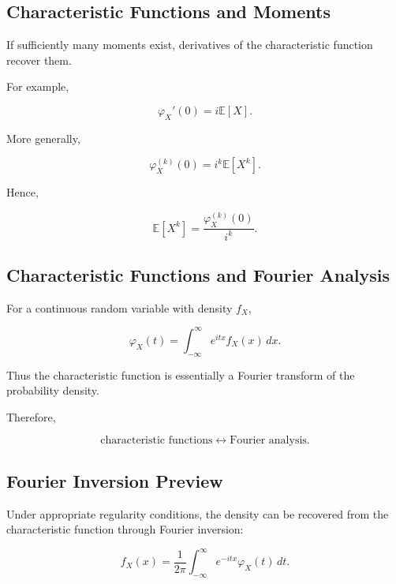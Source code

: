 \subsection{Characteristic Functions and Moments}
\label{subsec:cf-moments}

If sufficiently many moments exist, derivatives of the characteristic
function recover them.

For example,

\[
\varphi_X'(0)
=
i\mathbb{E}[X].
\]

More generally,

\[
\boxed{
\varphi_X^{(k)}(0)
=
i^k
\mathbb{E}[X^k].
}
\]

Hence,

\[
\boxed{
\mathbb{E}[X^k]
=
\frac{
\varphi_X^{(k)}(0)
}{
i^k
}.
}
\]

\subsection{Characteristic Functions and Fourier Analysis}
\label{subsec:cf-fourier-analysis}

For a continuous random variable with density \(f_X\),

\[
\varphi_X(t)
=
\int_{-\infty}^{\infty}
e^{itx}
f_X(x)\,dx.
\]

Thus the characteristic function is essentially a Fourier transform of
the probability density.

Therefore,

\[
\boxed{
\text{characteristic functions}
\longleftrightarrow
\text{Fourier analysis}.
}
\]

\subsection{Fourier Inversion Preview}
\label{subsec:fourier-inversion-probability}

Under appropriate regularity conditions, the density can be recovered
from the characteristic function through Fourier inversion:

\[
\boxed{
f_X(x)
=
\frac1{2\pi}
\int_{-\infty}^{\infty}
e^{-itx}
\varphi_X(t)\,dt.
}
\]

